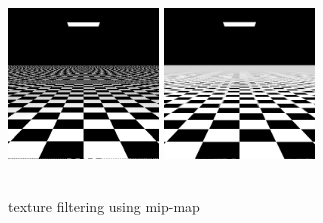 \documentclass[acmtog]{acmart}
\begin{document}
\begin{figure}[h]
	\centering
	\includegraphics[width=4cm,height=5cm]{gird-simple}
	\includegraphics[width=4cm,height=5cm]{mip-map}
	\caption{texture filtering using mip-map}
\end{figure}
\end{document}
